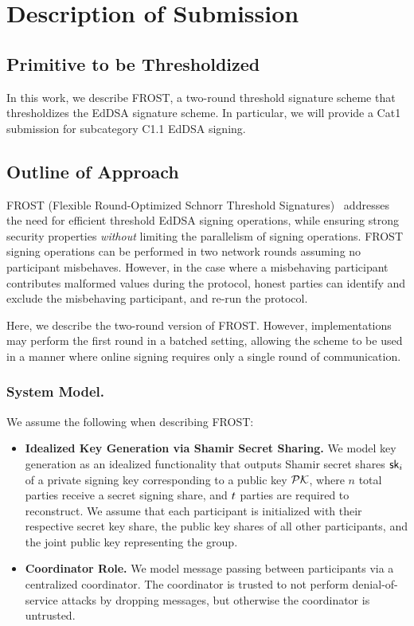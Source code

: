 
\section{Description of Submission}

\subsection{Primitive to be Thresholdized}

In this work,
we describe FROST,
a two-round threshold signature scheme that thresholdizes the EdDSA signature scheme.
In particular,
we will provide a Cat1 submission for subcategory C1.1 EdDSA signing.

\subsection{Outline of Approach}

FROST (Flexible Round-Optimized Schnorr Threshold Signatures)~\cite{KomloG20,BellareCKMTZ22} addresses the need for efficient threshold EdDSA signing operations,
while ensuring strong security properties \emph{without} limiting the parallelism of signing operations.
FROST signing operations can be performed in two network rounds assuming no participant misbehaves.
However, in the case where a misbehaving participant contributes malformed values during the protocol,
honest parties can identify and exclude the misbehaving participant, and re-run the protocol.

Here, we describe the two-round version of FROST.
However, implementations may perform the first round in a batched setting,
allowing the scheme to be used in a manner where online signing requires only a single round of communication.

\subsubsection{System Model.}
We assume the following when describing FROST:

\begin{itemize}[itemsep=0.5em]
\item \textbf{Idealized Key Generation via Shamir Secret Sharing.}
We model key generation as an idealized functionality that outputs Shamir secret shares $\mathsf{sk}_i$ of a private signing key corresponding to a public key $\mathcal{PK}$,
where $n$ total parties receive a secret signing share,
and $t$ parties are required to reconstruct.
We assume that each participant is initialized with their respective secret key share,
the public key shares of all other participants,
and the joint public key representing the group.
\item \textbf{Coordinator Role.} We model message passing between participants
via a centralized coordinator.
The coordinator is trusted to not perform denial-of-service attacks by dropping messages,
but otherwise the coordinator is untrusted.
\end{itemize}

